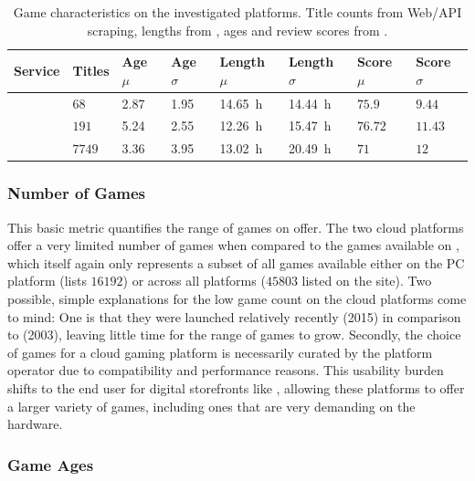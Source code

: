\begin{table}
\centering
\caption{Game characteristics on the investigated platforms. Title counts from Web/API scraping, lengths from \hltb, ages and review scores from \metacritic.}
\label{tab:game-stats}
	\begin{tabu}{X[2]|X[r]X[r]X[r]X[r]X[r]X[r]X[r]}
	\toprule
	Service & Titles & Age $\mu$ & Age $\sigma$ & Length $\mu$ & Length $\sigma$ & Score $\mu$ & Score $\sigma$ \\
	\midrule
	\gfnow & $68$ & \SI{2.87}{\year} & \SI{1.95}{\year} & \SI{14.65}{\hour} & \SI{14.44}{\hour} & $75.9$ & $9.44$ \\
	\psnow & $191$ & \SI{5.24}{\year} & \SI{2.55}{\year} & \SI{12.26}{\hour} & \SI{15.47}{\hour} & $76.72$ & $11.43$ \\
	\steam & $7749$ & \SI{3.36}{\year} & \SI{3.95}{\year} & \SI{13.02}{\hour} & \SI{20.49}{\hour} & $71$ & $12$ \\
	\bottomrule
	\end{tabu}
\end{table}


\subsubsection{Number of Games}

This basic metric quantifies the range of games on offer. The two cloud
platforms offer a very limited number of games when compared to the
games available on \steam, which itself again only represents a subset
of all games available either on the PC platform (\metacritic lists
$16192$) or across all platforms ($45803$ listed on the site). Two
possible, simple explanations for the low game count on the cloud
platforms come to mind: One is that they were launched relatively
recently (2015) in comparison to \steam (2003), leaving little time for
the range of games to grow. Secondly, the choice of games for a cloud
gaming platform is necessarily curated by the platform operator due to
compatibility and performance reasons. This usability burden shifts to
the end user for digital storefronts like \steam, allowing these
platforms to offer a larger variety of games, including ones that are
very demanding on the hardware.


\subsubsection{Game Ages}

